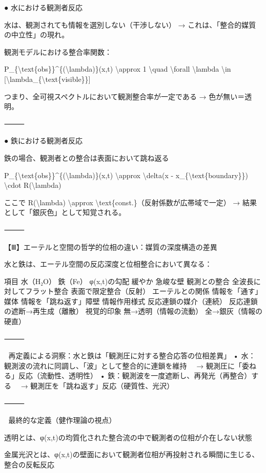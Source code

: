 \documentclass{article}
\begin{document}
● 水における観測者反応 

水は、観測されても情報を選別しない（干渉しない） 
→ これは、「整合的媒質の中立性」の現れ。 

観測モデルにおける整合率関数： 

P\_\{\textbackslash{}text\{obs\}\}\textasciicircum{}\{(\textbackslash{}lambda)\}(x,t) \textbackslash{}approx 1 \textbackslash{}quad \textbackslash{}forall \textbackslash{}lambda \textbackslash{}in [\textbackslash{}lambda\_\{\textbackslash{}text\{visible\}\}] 

つまり、全可視スペクトルにおいて観測整合率が一定である → 色が無い＝透明。 

⸻ 

● 鉄における観測者反応 

鉄の場合、観測者との整合は表面において跳ね返る 

P\_\{\textbackslash{}text\{obs\}\}\textasciicircum{}\{(\textbackslash{}lambda)\}(x,t) \textbackslash{}approx \textbackslash{}delta(x - x\_\{\textbackslash{}text\{boundary\}\}) \textbackslash{}cdot R(\textbackslash{}lambda) 

ここで R(\textbackslash{}lambda) \textbackslash{}approx \textbackslash{}text\{const.\}（反射係数が広帯域で一定） 
→ 結果として「銀灰色」として知覚される。 

⸻ 

【Ⅲ】エーテルと空間の哲学的位相の違い：媒質の深度構造の差異 

水と鉄は、エーテル空間の反応深度と位相整合において異なる： 

項目 水（H₂O） 鉄（Fe） 
φ(x,t)の勾配 緩やか 急峻な壁 
観測との整合 全波長に対してフラット整合 表面で限定整合（反射） 
エーテルとの関係 情報を「通す」媒体 情報を「跳ね返す」障壁 
情報作用様式 反応連鎖の媒介（連続） 反応連鎖の遮断→再生成（離散） 
視覚的印象 無→透明（情報の流動） 全→銀灰（情報の硬直） 


⸻ 

🎯 再定義による洞察：水と鉄は「観測圧に対する整合応答の位相差異」 
• 水：観測波の流れに同調し、「波」として整合的に連鎖を維持 
　→ 観測圧に「委ねる」反応（流動性、透明性） 
• 鉄：観測波を一度遮断し、再発光（再整合）する 
　→ 観測圧を「跳ね返す」反応（硬質性、光沢） 

⸻ 

🌌 最終的な定義（健作理論の視点） 

透明とは、φ(x,t)の均質化された整合流の中で観測者の位相が介在しない状態 

金属光沢とは、φ(x,t)の壁面において観測者位相が再投射される瞬間に生じる、整合の反転反応 
\end{document}
